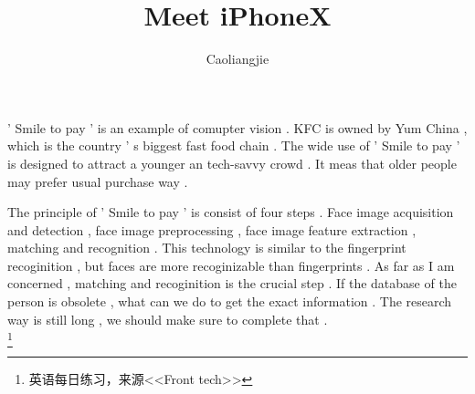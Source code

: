 \documentclass[50pt]{article}
\begin{document}
\title{Meet iPhoneX}
\author{Caoliangjie}
\maketitle
\par
 ' Smile to pay ' is an example of comupter vision . KFC is owned by Yum China , which is the country ' s biggest fast food chain . The wide use of ' Smile to pay ' is designed to attract a younger an tech-savvy crowd . It meas that older people may prefer usual purchase way . \\
\par
The principle of ' Smile to pay ' is consist of four steps . Face image acquisition and detection , face image preprocessing , face image feature extraction , matching and recognition . This technology is similar to the fingerprint recoginition , but faces are more recoginizable than fingerprints . As far as I am concerned , matching and recoginition is the crucial step . If the database of the person is obsolete , what can we do to get the exact information . The research way is still long , we should make sure to complete that . \\
\footnote{\centering 英语每日练习，来源<<Front tech>>}
\end{document}
